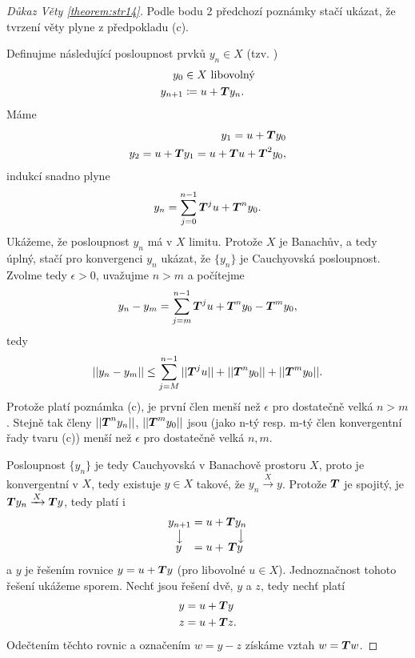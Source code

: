 \begin{proof}[Důkaz Věty \ref{theorem:str14}]
Podle bodu 2 předchozí poznámky stačí ukázat, že tvrzení věty plyne  z předpokladu (c).

Definujme následující posloupnost prvků $y_n\in X$ (tzv. )
\begin{equation*}
    \begin{split}
    y_0&\in X \text{ libovolný}\\
    y_{n+1}&\coloneqq u+ \boldsymbol{T} y_n.
    \end{split}
\end{equation*}
Máme 
\begin{equation*}
    \begin{split}
    y_1=u+ \boldsymbol{T} y_0\\
    y_2=u+ \boldsymbol{T} y_1=u+ \boldsymbol{T} u+ \boldsymbol{T} ^2y_0,
    \end{split}
\end{equation*}
indukcí snadno plyne
\begin{equation}
    y_n=\sum\limits_{j=0}^{n-1} \boldsymbol{T} ^ju+ \boldsymbol{T} ^ny_0.    \label{eq:yn_suma}
\end{equation}
Ukážeme, že posloupnost $y_n$ má v $X$ limitu. Protože $X$ je Banachův, a tedy úplný, stačí pro konvergenci $y_n$ ukázat, že $\{y_n\}$ je Cauchyovská posloupnost. Zvolme tedy $\epsilon>0$, uvažujme $n>m$ a počítejme
$$y_n-y_m=\sum\limits_{j=m}^{n-1} \boldsymbol{T} ^ju+ \boldsymbol{T} ^ny_0- \boldsymbol{T} ^my_0,$$
tedy $$||y_n-y_m||\leq \sum\limits_{j=M}^{n-1}|| \boldsymbol{T} ^ju||+|| \boldsymbol{T} ^ny_0||+|| \boldsymbol{T} ^my_0||.$$
Protože platí poznámka (c), je první člen menší než $\epsilon$ pro dostatečně velká $n>m$. Stejně tak členy $|| \boldsymbol{T} ^ny_n||$, $|| \boldsymbol{T} ^my_0||$ jsou (jako n-tý resp. m-tý člen konvergentní řady tvaru (c)) menší než $\epsilon$ pro dostatečně velká $n,m$. 

Posloupnost $\{y_n\}$ je tedy Cauchyovská v Banachově prostoru $X$, proto je konvergentní v $X$, tedy existuje $y\in X$ takové, že $y_n\xrightarrow{X} y$. Protože $ \boldsymbol{T} $ je spojitý, je $ \boldsymbol{T} y_n\xrightarrow{X} \boldsymbol{T} y$, tedy platí i 
\begin{equation*}
    \begin{split}
        \underset{\big\downarrow}{y_{n+1}}&=u+ \boldsymbol{T} \underset{\big\downarrow }{y_n}\\[-7pt]
        y\;\;\;&=u+ \,\boldsymbol{T} y
    \end{split}
\end{equation*}
a $y$ je řešením rovnice $y=u+ \boldsymbol{T} y$ (pro libovolné $u\in X$). Jednoznačnost tohoto řešení ukážeme sporem. Nechť jsou řešení dvě, $y$ a $z$, tedy nechť platí 
\begin{equation*}
    \begin{split}
        y&=u+ \boldsymbol{T} y\\
        z&=u+ \boldsymbol{T} z.
    \end{split}
\end{equation*}
Odečtením těchto rovnic a označením $w=y-z$ získáme vztah $w= \boldsymbol{T} w$. 


\end{proof}
